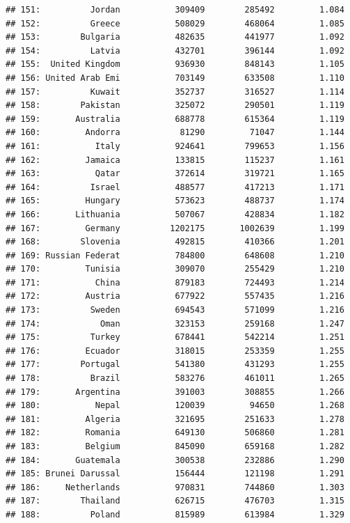 \documentclass[10pt,]{article}
\begin{document}
\begin{verbatim}
## 151:          Jordan           309409        285492         1.084
## 152:          Greece           508029        468064         1.085
## 153:        Bulgaria           482635        441977         1.092
## 154:          Latvia           432701        396144         1.092
## 155:  United Kingdom           936930        848143         1.105
## 156: United Arab Emi           703149        633508         1.110
## 157:          Kuwait           352737        316527         1.114
## 158:        Pakistan           325072        290501         1.119
## 159:       Australia           688778        615364         1.119
## 160:         Andorra            81290         71047         1.144
## 161:           Italy           924641        799653         1.156
## 162:         Jamaica           133815        115237         1.161
## 163:           Qatar           372614        319721         1.165
## 164:          Israel           488577        417213         1.171
## 165:         Hungary           573623        488737         1.174
## 166:       Lithuania           507067        428834         1.182
## 167:         Germany          1202175       1002639         1.199
## 168:        Slovenia           492815        410366         1.201
## 169: Russian Federat           784800        648608         1.210
## 170:         Tunisia           309070        255429         1.210
## 171:           China           879183        724493         1.214
## 172:         Austria           677922        557435         1.216
## 173:          Sweden           694543        571099         1.216
## 174:            Oman           323153        259168         1.247
## 175:          Turkey           678441        542214         1.251
## 176:         Ecuador           318015        253359         1.255
## 177:        Portugal           541380        431293         1.255
## 178:          Brazil           583276        461011         1.265
## 179:       Argentina           391003        308855         1.266
## 180:           Nepal           120039         94650         1.268
## 181:         Algeria           321695        251633         1.278
## 182:         Romania           649130        506860         1.281
## 183:         Belgium           845090        659168         1.282
## 184:       Guatemala           300538        232886         1.290
## 185: Brunei Darussal           156444        121198         1.291
## 186:     Netherlands           970831        744860         1.303
## 187:        Thailand           626715        476703         1.315
## 188:          Poland           815989        613984         1.329

\end{verbatim}
\end{document}
